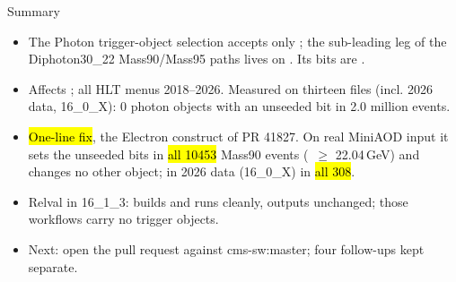 \begin{frame}{Summary}
  \begin{itemize}
    \item The Photon trigger-object selection accepts only ; the sub-leading leg of the
          Diphoton30\_22 Mass90/Mass95 paths lives on . Its bits are
          .
    \item Affects ; all HLT menus 2018--2026. Measured on thirteen files
          (incl. 2026 data, 16\_0\_X): 0 photon objects with an unseeded bit in 2.0 million events.
    \item \hl{One-line fix}, the Electron construct of PR 41827. On real MiniAOD input it sets the unseeded bits in
          \hl{all 10453} Mass90 events (\pT\ $\geq$ 22.04\,GeV) and changes no other object; in 2026 data (16\_0\_X) in \hl{all 308}.
    \item Relval in 16\_1\_3: builds and runs cleanly, outputs unchanged; those workflows carry no trigger objects.
    \item Next: open the pull request against cms-sw:master; four follow-ups kept separate.
  \end{itemize}
\end{frame}


